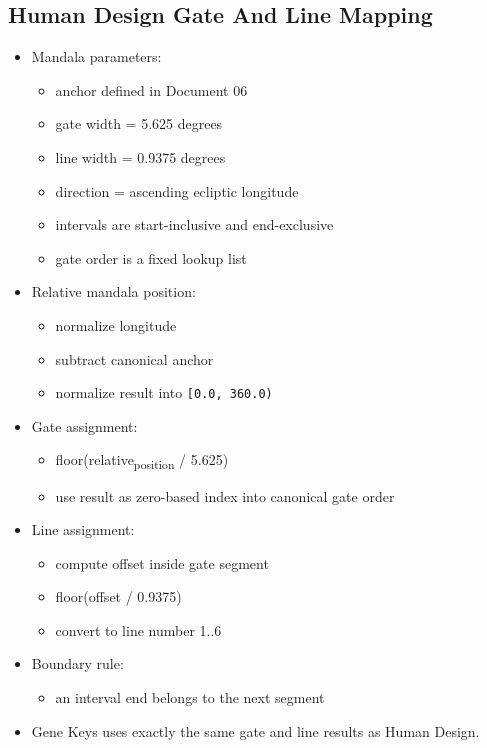 \documentclass[11pt]{article}
\begin{document}
\subsection{Human Design Gate And Line Mapping}
\label{sec:org09af851}
\begin{itemize}
\item Mandala parameters:
\begin{itemize}
\item anchor defined in Document 06
\item gate width = 5.625 degrees
\item line width = 0.9375 degrees
\item direction = ascending ecliptic longitude
\item intervals are start-inclusive and end-exclusive
\item gate order is a fixed lookup list
\end{itemize}
\item Relative mandala position:
\begin{itemize}
\item normalize longitude
\item subtract canonical anchor
\item normalize result into \texttt{[0.0, 360.0)}
\end{itemize}
\item Gate assignment:
\begin{itemize}
\item floor(relative\textsubscript{position} / 5.625)
\item use result as zero-based index into canonical gate order
\end{itemize}
\item Line assignment:
\begin{itemize}
\item compute offset inside gate segment
\item floor(offset / 0.9375)
\item convert to line number 1..6
\end{itemize}
\item Boundary rule:
\begin{itemize}
\item an interval end belongs to the next segment
\end{itemize}
\item Gene Keys uses exactly the same gate and line results as Human Design.
\end{itemize}
\end{document}
